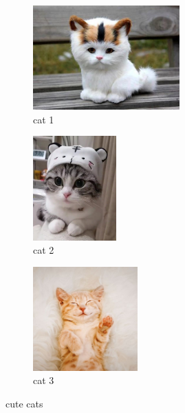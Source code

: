 \documentclass[10pt,a4paper]{report}
\begin{document}
\begin{figure}
    \centering
    \begin{subfigure}{0.3\textwidth}
    \includegraphics[width=1.1\linewidth, height=4cm]{images/2.jpg}
    \caption{cat 1}
    \label{fig:sub1}
    \end{subfigure}
    \begin{subfigure}{0.3\textwidth}
    \includegraphics[width=1.1\linewidth, height=4cm]{images/3.jpg}
    \caption{cat 2}
    \label{fig:sub2}
    \end{subfigure}
    \begin{subfigure}{0.3\textwidth}
    \includegraphics[width=1.1\linewidth, height=4cm]{images/4.jpg}
    \caption{cat 3}
    \label{fig:sub3}
    \end{subfigure}
    \caption{cute cats}
\end{figure}
\clearpage
\end{document}
